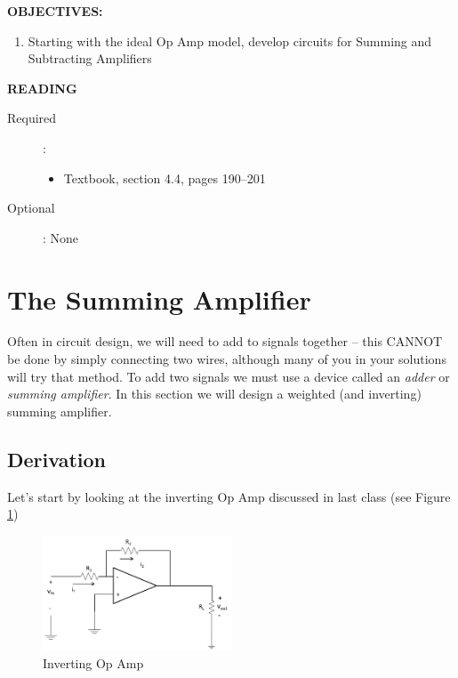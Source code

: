 \documentclass{handout}
\begin{document}
\maketitle

\textbf{OBJECTIVES:}
\begin{enumerate}
\item Starting with the ideal Op Amp model, develop circuits for Summing and Subtracting Amplifiers
\end{enumerate}

\textbf{READING}
\begin{description}
\item [Required]:
\begin{itemize}
\item  Textbook, section 4.4, pages 190--201
\end{itemize}
\item [Optional]: None
\end{description}

\section{The Summing Amplifier}
Often in circuit design, we will need to add to signals together -- this CANNOT be done by simply connecting two wires, although many of you in your solutions will try that method.  To add two signals we must use a device called an {\em adder} or {\em summing amplifier}.   In this section we will design a weighted (and inverting) summing amplifier.

\subsection{Derivation}
Let's start by looking at the inverting Op Amp discussed in last class (see Figure \ref{fig: InvertingOpAmp})

\begin{figure} [h! t! b!]
\centering
\includegraphics[width=0.5\textwidth]{InvertingOpAmp.jpg}
\caption{Inverting Op Amp}
\label{fig: InvertingOpAmp}
\end{figure}
\end{document}
